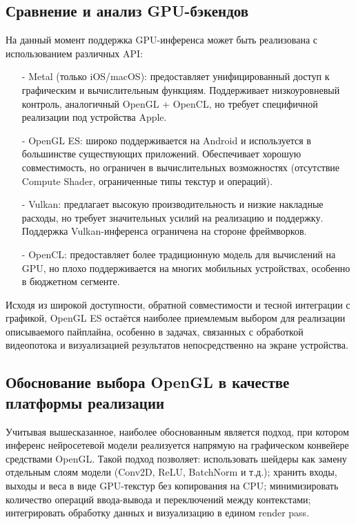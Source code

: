 \documentclass[a4paper,14pt]{extreport}
\begin{document}
            \subsection{Сравнение и анализ GPU-бэкендов}
            На данный момент поддержка GPU-инференса может быть реализована с использованием различных API:
            \begin{itemize}
                \item[-] Metal (только iOS/macOS): предоставляет унифицированный доступ к графическим и вычислительным функциям. Поддерживает низкоуровневый контроль, аналогичный OpenGL + OpenCL, но требует специфичной реализации под устройства Apple.
                \item[-] OpenGL ES: широко поддерживается на Android и используется в большинстве существующих приложений. Обеспечивает хорошую совместимость, но ограничен в вычислительных возможностях (отсутствие Compute Shader, ограниченные типы текстур и операций).
                \item[-] Vulkan: предлагает высокую производительность и низкие накладные расходы, но требует значительных усилий на реализацию и поддержку. Поддержка Vulkan-инференса ограничена на стороне фреймворков.
                \item[-] OpenCL: предоставляет более традиционную модель для вычислений на GPU, но плохо поддерживается на многих мобильных устройствах, особенно в бюджетном сегменте.
            \end{itemize}
            Исходя из широкой доступности, обратной совместимости и тесной интеграции с графикой, OpenGL ES остаётся наиболее приемлемым выбором для реализации описываемого пайплайна, особенно в задачах, связанных с обработкой видеопотока и визуализацией результатов непосредственно на экране устройства.
            
            \subsection{Обоснование выбора OpenGL в качестве платформы реализации}
            Учитывая вышесказанное, наиболее обоснованным является подход, при котором инференс нейросетевой модели реализуется напрямую на графическом конвейере средствами OpenGL. Такой подход позволяет:  использовать шейдеры как замену отдельным слоям модели (Conv2D, ReLU, BatchNorm и т.д.); хранить входы, выходы и веса в виде GPU-текстур без копирования на CPU; минимизировать количество операций ввода-вывода и переключений между контекстами; интегрировать обработку данных и визуализацию в едином render pass.
            
\end{document}
